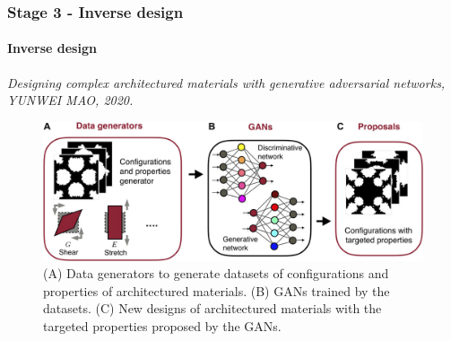 \documentclass[
	10pt, %
]{beamer}
\begin{document}
\begin{frame}
	\frametitle{Stage 3 - Inverse design}
	\framesubtitle{Inverse design}
	\textit{Designing complex architectured materials with generative adversarial networks, YUNWEI MAO, 2020.}
	\begin{figure}
		\includegraphics[width=0.8\linewidth]{figures/ML_procedure.jpeg}
		\caption{(A) Data generators to generate datasets of configurations and properties of architectured materials. (B) GANs trained by the datasets. (C) New designs of architectured materials with the targeted properties proposed by the GANs.}
	\end{figure}
\end{frame}
\end{document}
